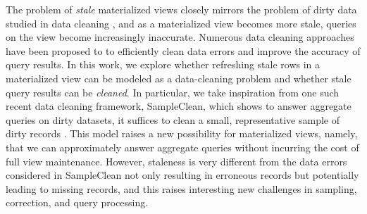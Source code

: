 The problem of \emph{stale} materialized views closely mirrors the problem of dirty data studied in data cleaning \cite{rahm2000data}, and 
as a materialized view becomes more stale, queries on the view become increasingly inaccurate.
Numerous data cleaning approaches have been proposed to to efficiently clean data errors and improve the accuracy of query results.
In this work, we explore whether refreshing stale rows in a materialized view can be modeled as a data-cleaning problem and whether stale query results can be \emph{cleaned}.
In particular, we take inspiration from one such recent data cleaning framework, SampleClean, which shows to answer aggregate queries on dirty datasets, it suffices to clean a small, representative sample of dirty records \cite{wang1999sample}.
This model raises a new possibility for materialized views, namely, that we can approximately answer aggregate queries without incurring the cost of full view maintenance.
However, staleness is very different from the data errors considered in SampleClean not only resulting in erroneous records but potentially leading to missing records, and this raises interesting new challenges in sampling, correction, and query processing.





